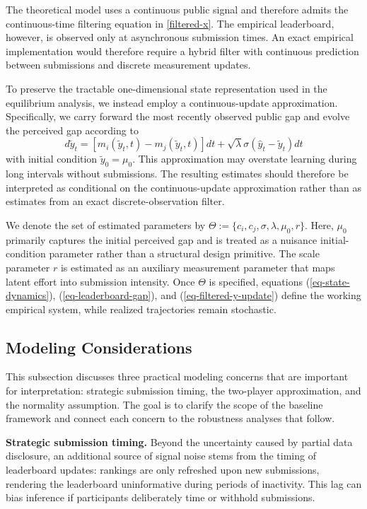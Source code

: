 \documentclass[mnsc]{informs3}
\begin{document}
The theoretical model uses a continuous public signal and therefore admits the continuous-time filtering equation in \eqref{filtered-x}. The empirical leaderboard, however, is observed only at asynchronous submission times. An exact empirical implementation would therefore require a hybrid filter with continuous prediction between submissions and discrete measurement updates.

To preserve the tractable one-dimensional state representation used in the equilibrium analysis, we instead employ a continuous-update approximation. Specifically, we carry forward the most recently observed public gap and evolve the perceived gap according to
\begin{equation}\label{eq-filtered-y-update}
d\tilde{y}_{t} = \left[m_i(\tilde{y}_t, t) - m_j(\tilde{y}_t, t)\right]dt + \sqrt{\lambda}\sigma(\hat{y}_t-\tilde{y}_{t}) dt
\end{equation}
with initial condition $\tilde{y}_0 = \mu_0$.
This approximation may overstate learning during long intervals without submissions. The resulting estimates should therefore be interpreted as conditional on the continuous-update approximation rather than as estimates from an exact discrete-observation filter.

We denote the set of estimated parameters by $\Theta := \{c_i, c_j, \sigma, \lambda, \mu_0,r\}$.
Here, $\mu_0$ primarily captures the initial perceived gap and is treated as a nuisance initial-condition parameter rather than a structural design primitive.
The scale parameter $r$ is estimated as an auxiliary measurement parameter that maps latent effort into submission intensity.
Once $\Theta$ is specified, equations (\ref{eq-state-dynamics}), (\ref{eq-leaderboard-gap}), and (\ref{eq-filtered-y-update}) define the working empirical system, while realized trajectories remain stochastic.



\subsection{Modeling Considerations}\label{sect-concerns}

This subsection discusses three practical modeling concerns that are important for interpretation: strategic submission timing, the two-player approximation, and the normality assumption.
The goal is to clarify the scope of the baseline framework and connect each concern to the robustness analyses that follow.

\textbf{Strategic submission timing.}
Beyond the uncertainty caused by partial data disclosure, an additional source of signal noise stems from the timing of leaderboard updates: rankings are only refreshed upon new submissions, rendering the leaderboard uninformative during periods of inactivity.
This lag can bias inference if participants deliberately time or withhold submissions.
\end{document}
